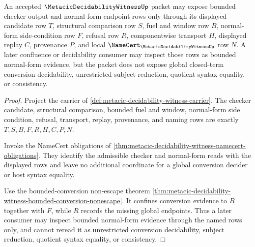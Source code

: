\begin{theorem}
\label{thm:metacic-decidability-witness-bounded-normal-form-split}
An accepted $\MetacicDecidabilityWitnessUp$ packet may expose bounded checker output and normal-form endpoint rows only through its displayed candidate row $T$, structural comparison row $S$, fuel and window row $B$, normal-form side-condition row $F$, refusal row $R$, componentwise transport $H$, displayed replay $C$, provenance $P$, and local $\NameCert_{\MetacicDecidabilityWitnessUp}$ row $N$. A later confluence or decidability consumer may inspect those rows as bounded normal-form evidence, but the packet does not expose global closed-term conversion decidability, unrestricted subject reduction, quotient syntax equality, or consistency.
\end{theorem}
\begin{proof}
Project the carrier of \autoref{def:metacic-decidability-witness-carrier}. The checker candidate, structural comparison, bounded fuel and window, normal-form side condition, refusal, transport, replay, provenance, and naming rows are exactly $T,S,B,F,R,H,C,P,N$.

Invoke the NameCert obligations of \autoref{thm:metacic-decidability-witness-namecert-obligations}. They identify the admissible checker and normal-form reads with the displayed rows and leave no additional coordinate for a global conversion decider or host syntax equality.

Use the bounded-conversion non-escape theorem \autoref{thm:metacic-decidability-witness-bounded-conversion-nonescape}. It confines conversion evidence to $B$ together with $F$, while $R$ records the missing global endpoints. Thus a later consumer may inspect bounded normal-form evidence through the named rows only, and cannot reread it as unrestricted conversion decidability, subject reduction, quotient syntax equality, or consistency.
\end{proof}


